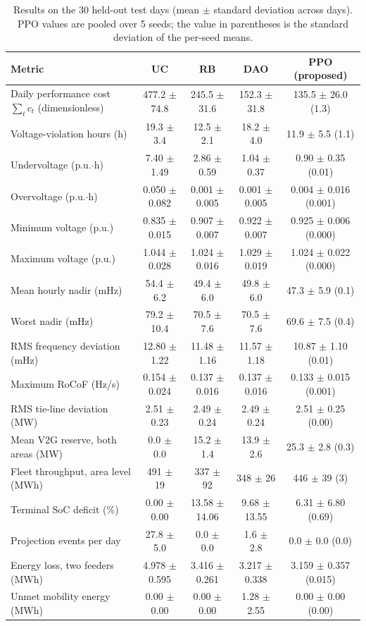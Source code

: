 \begin{table}[!t]
\caption{Results on the 30 held-out test days (mean $\pm$ standard deviation across days). PPO values are pooled over 5 seeds; the value in parentheses is the standard deviation of the per-seed means.}
\label{tab:test}
\centering
\footnotesize
\begin{tabular}{lcccc}
\toprule
\textbf{Metric} & \textbf{UC} & \textbf{RB} & \textbf{DAO} & \textbf{PPO (proposed)}\\
\midrule
Daily performance cost $\sum_t c_t$ (dimensionless) & 477.2 $\pm$ 74.8 & 245.5 $\pm$ 31.6 & 152.3 $\pm$ 31.8 & 135.5 $\pm$ 26.0 (1.3) \\
Voltage-violation hours (h) & 19.3 $\pm$ 3.4 & 12.5 $\pm$ 2.1 & 18.2 $\pm$ 4.0 & 11.9 $\pm$ 5.5 (1.1) \\
Undervoltage (p.u.$\cdot$h) & 7.40 $\pm$ 1.49 & 2.86 $\pm$ 0.59 & 1.04 $\pm$ 0.37 & 0.90 $\pm$ 0.35 (0.01) \\
Overvoltage (p.u.$\cdot$h) & 0.050 $\pm$ 0.082 & 0.001 $\pm$ 0.005 & 0.001 $\pm$ 0.005 & 0.004 $\pm$ 0.016 (0.001) \\
Minimum voltage (p.u.) & 0.835 $\pm$ 0.015 & 0.907 $\pm$ 0.007 & 0.922 $\pm$ 0.007 & 0.925 $\pm$ 0.006 (0.000) \\
Maximum voltage (p.u.) & 1.044 $\pm$ 0.028 & 1.024 $\pm$ 0.016 & 1.029 $\pm$ 0.019 & 1.024 $\pm$ 0.022 (0.000) \\
Mean hourly nadir (mHz) & 54.4 $\pm$ 6.2 & 49.4 $\pm$ 6.0 & 49.8 $\pm$ 6.0 & 47.3 $\pm$ 5.9 (0.1) \\
Worst nadir (mHz) & 79.2 $\pm$ 10.4 & 70.5 $\pm$ 7.6 & 70.5 $\pm$ 7.6 & 69.6 $\pm$ 7.5 (0.4) \\
RMS frequency deviation (mHz) & 12.80 $\pm$ 1.22 & 11.48 $\pm$ 1.16 & 11.57 $\pm$ 1.18 & 10.87 $\pm$ 1.10 (0.01) \\
Maximum RoCoF (Hz/s) & 0.154 $\pm$ 0.024 & 0.137 $\pm$ 0.016 & 0.137 $\pm$ 0.016 & 0.133 $\pm$ 0.015 (0.001) \\
RMS tie-line deviation (MW) & 2.51 $\pm$ 0.23 & 2.49 $\pm$ 0.24 & 2.49 $\pm$ 0.24 & 2.51 $\pm$ 0.25 (0.00) \\
Mean V2G reserve, both areas (MW) & 0.0 $\pm$ 0.0 & 15.2 $\pm$ 1.4 & 13.9 $\pm$ 2.6 & 25.3 $\pm$ 2.8 (0.3) \\
Fleet throughput, area level (MWh) & 491 $\pm$ 19 & 337 $\pm$ 92 & 348 $\pm$ 26 & 446 $\pm$ 39 (3) \\
Terminal SoC deficit (\%) & 0.00 $\pm$ 0.00 & 13.58 $\pm$ 14.06 & 9.68 $\pm$ 13.55 & 6.31 $\pm$ 6.80 (0.69) \\
Projection events per day & 27.8 $\pm$ 5.0 & 0.0 $\pm$ 0.0 & 1.6 $\pm$ 2.8 & 0.0 $\pm$ 0.0 (0.0) \\
Energy loss, two feeders (MWh) & 4.978 $\pm$ 0.595 & 3.416 $\pm$ 0.261 & 3.217 $\pm$ 0.338 & 3.159 $\pm$ 0.357 (0.015) \\
Unmet mobility energy (MWh) & 0.00 $\pm$ 0.00 & 0.00 $\pm$ 0.00 & 1.28 $\pm$ 2.55 & 0.00 $\pm$ 0.00 (0.00) \\
\bottomrule
\end{tabular}
\end{table}
